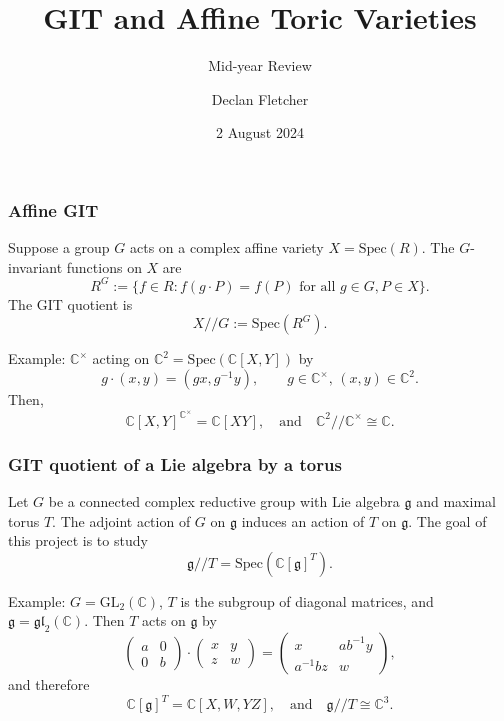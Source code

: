 \documentclass{beamer}
\title{GIT and Affine Toric Varieties}
\subtitle{Mid-year Review}
\author{Declan Fletcher}
\date{2 August 2024}
\theoremstyle{definition}
\begin{document}
\frame{\titlepage}

\begin{frame}
\frametitle{Affine GIT}
\pause
Suppose a group $G$ acts on a complex affine variety $X = \mathrm{Spec}(R)$.
The $G$-invariant functions on $X$ are
$$R^G := \{f \in R : f(g \cdot P) = f(P) \text{ for all } g \in G, P \in X\}.$$
The GIT quotient is
$$X /\!\!/ G := \mathrm{Spec}(R^G).$$

\pause
Example: $\mathbb{C}^\times$ acting on $\mathbb{C}^2=\mathrm{Spec}(\mathbb{C}[X, Y])$ by
$$g \cdot (x, y) = (g x, g^{-1} y), 
\qquad g \in \mathbb{C}^\times, \, (x, y) \in \mathbb{C}^2.$$
Then,
$$\mathbb{C}[X, Y]^{\mathbb{C}^\times} = \mathbb{C}[XY], 
\quad \text{and} \quad \mathbb{C}^2 /\!\!/ \mathbb{C}^\times \cong \mathbb{C}.$$
\end{frame}

\begin{frame}
\frametitle{GIT quotient of a Lie algebra by a torus}
\pause
Let $G$ be a connected complex reductive group with Lie algebra $\mathfrak{g}$ and maximal torus $T$.
The adjoint action of $G$ on $\mathfrak{g}$ induces an action of $T$ on $\mathfrak{g}$.
The goal of this project is to study
$$\mathfrak{g} /\!\!/ T = \mathrm{Spec}(\mathbb{C}[\mathfrak{g}]^T).$$

\pause
Example: $G = \mathrm{GL}_2(\mathbb{C})$, $T$ is the subgroup of diagonal matrices, and $\mathfrak{g}=\mathfrak{gl}_2(\mathbb{C})$.
Then $T$ acts on $\mathfrak{g}$ by
$$\begin{pmatrix} a & 0 \\ 0 & b \end{pmatrix} \cdot \begin{pmatrix} x & y \\ z & w \end{pmatrix}
= \begin{pmatrix} x & a b^{-1} y \\ a^{-1} b z & w \end{pmatrix},$$
and therefore
$$\mathbb{C}[\mathfrak{g}]^T = \mathbb{C}[X, W, YZ], \quad \text{and} \quad \mathfrak{g} /\!\!/ T \cong \mathbb{C}^3.$$

\end{frame}
\end{document}
